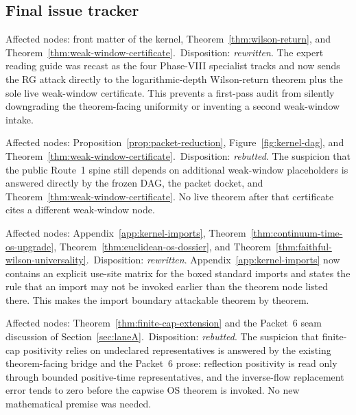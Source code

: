 \subsection*{Final issue tracker}
\begin{description}[leftmargin=2.2em,style=nextline]
\item[RG-01 -- hidden quantifier shift.] Affected nodes: front matter of the kernel, Theorem~\ref{thm:wilson-return}, and Theorem~\ref{thm:weak-window-certificate}.\
Disposition: \emph{rewritten}. The expert reading guide was recast as the four Phase-VIII specialist tracks and now sends the RG attack directly to the logarithmic-depth Wilson-return theorem plus the sole live weak-window certificate. This prevents a first-pass audit from silently downgrading the theorem-facing uniformity or inventing a second weak-window intake.

\item[RG-02 -- false citation.] Affected nodes: Proposition~\ref{prop:packet-reduction}, Figure~\ref{fig:kernel-dag}, and Theorem~\ref{thm:weak-window-certificate}.\
Disposition: \emph{rebutted}. The suspicion that the public Route~1 spine still depends on additional weak-window placeholders is answered directly by the frozen DAG, the packet docket, and Theorem~\ref{thm:weak-window-certificate}. No live theorem after that certificate cites a different weak-window node.

\item[OS-01 -- missing implication.] Affected nodes: Appendix~\ref{app:kernel-imports}, Theorem~\ref{thm:continuum-time-os-upgrade}, Theorem~\ref{thm:euclidean-os-dossier}, and Theorem~\ref{thm:faithful-wilson-universality}.\
Disposition: \emph{rewritten}. Appendix~\ref{app:kernel-imports} now contains an explicit use-site matrix for the boxed standard imports and states the rule that an import may not be invoked earlier than the theorem node listed there. This makes the import boundary attackable theorem by theorem.

\item[OS-02 -- real mathematical gap.] Affected nodes: Theorem~\ref{thm:finite-cap-extension} and the Packet~6 seam discussion of Section~\ref{sec:laneA}.\
Disposition: \emph{rebutted}. The suspicion that finite-cap positivity relies on undeclared representatives is answered by the existing theorem-facing bridge and the Packet~6 prose: reflection positivity is read only through bounded positive-time representatives, and the inverse-flow replacement error tends to zero before the capwise OS theorem is invoked. No new mathematical premise was needed.


\end{description}
